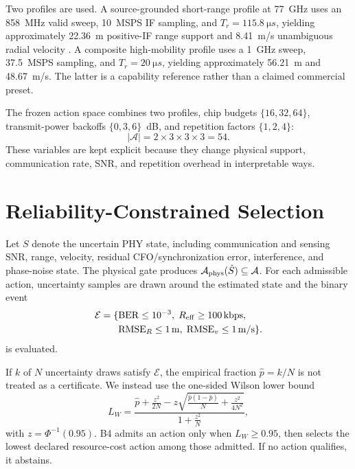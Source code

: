 \documentclass[conference,a4paper]{IEEEtran}
\begin{document}
Two profiles are used. A source-grounded short-range profile at \SI{77}{GHz} uses an \SI{858}{MHz} valid sweep, \SI{10}{MSPS} IF sampling, and $T_r=\SI{115.8}{\micro s}$, yielding approximately 22.36~m positive-IF range support and 8.41~m/s unambiguous radial velocity \cite{tiParking}. A composite high-mobility profile uses a \SI{1}{GHz} sweep, \SI{37.5}{MSPS} sampling, and $T_r=\SI{20}{\micro s}$, yielding approximately 56.21~m and 48.67~m/s. The latter is a capability reference rather than a claimed commercial preset.

The frozen action space combines two profiles, chip budgets $\{16,32,64\}$, transmit-power backoffs $\{0,3,6\}$~dB, and repetition factors $\{1,2,4\}$:
\begin{equation}
|\mathcal A|=2\times3\times3\times3=54.
\end{equation}
These variables are kept explicit because they change physical support, communication rate, SNR, and repetition overhead in interpretable ways.

\section{Reliability-Constrained Selection}

Let $S$ denote the uncertain PHY state, including communication and sensing SNR, range, velocity, residual CFO/synchronization error, interference, and phase-noise state. The physical gate produces $\mathcal A_{\rm phys}(\hat S)\subseteq\mathcal A$. For each admissible action, uncertainty samples are drawn around the estimated state and the binary event
\begin{align}
\mathcal E=\{&
\mathrm{BER}\le10^{-3},\;
R_{\rm eff}\ge\SI{100}{kbps}, \nonumber\\
&\mathrm{RMSE}_R\le\SI{1}{m},\;
\mathrm{RMSE}_v\le\SI{1}{m/s}\}.
\end{align}
is evaluated.

If $k$ of $N$ uncertainty draws satisfy $\mathcal E$, the empirical fraction $\hat p=k/N$ is not treated as a certificate. We instead use the one-sided Wilson lower bound \cite{brown2001binomial}
\begin{equation}
L_W=
\frac{\hat p+\frac{z^2}{2N}
-z\sqrt{\frac{\hat p(1-\hat p)}{N}+\frac{z^2}{4N^2}}}
{1+\frac{z^2}{N}},
\end{equation}
with $z=\Phi^{-1}(0.95)$. B4 admits an action only when $L_W\ge0.95$, then selects the lowest declared resource-cost action among those admitted. If no action qualifies, it abstains.
\end{document}
